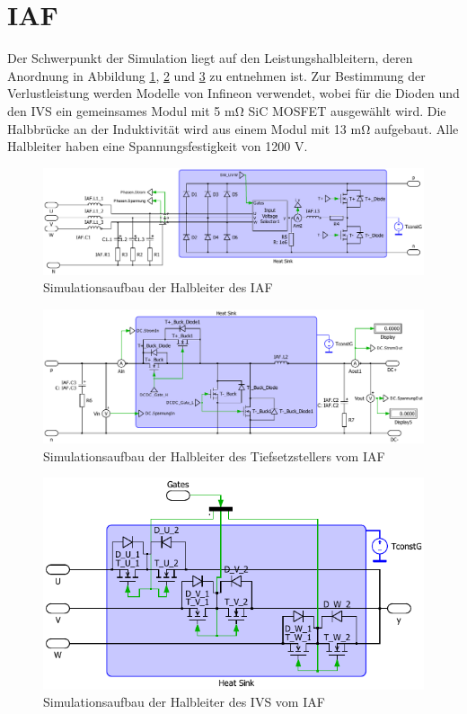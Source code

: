 \section{IAF}
	Der Schwerpunkt der Simulation liegt auf den Leistungshalbleitern, deren Anordnung in Abbildung \ref{fig:iafplecsmain}, \ref{fig:iafplecsbuck} und \ref{fig:iafplecsivs} zu entnehmen ist. Zur Bestimmung der Verlustleistung werden Modelle von Infineon verwendet, wobei für die Dioden und den \gls{IVS} ein gemeinsames Modul mit 5 \si{\milli \ohm} \gls{SiC} \gls{MOSFET} ausgewählt wird. Die Halbbrücke an der Induktivität wird aus einem Modul mit 13 \si{\milli \ohm} aufgebaut. Alle Halbleiter haben eine Spannungsfestigkeit von 1200 V.
	\begin{figure}
		\centering
		\includegraphics[width=1\linewidth]{content/Grafiken/IAF_Plecs_main}
		\caption{Simulationsaufbau der Halbleiter des IAF}
		\label{fig:iafplecsmain}
	\end{figure}
	\begin{figure}
		\centering
		\includegraphics[width=1\linewidth]{content/Grafiken/IAF_Plecs_Buck}
		\caption{Simulationsaufbau der Halbleiter des Tiefsetzstellers vom IAF}
		\label{fig:iafplecsbuck}
	\end{figure}
	
	\begin{figure}
		\centering
		\includegraphics[width=0.7\linewidth]{content/Grafiken/IAF_Plecs_IVS}
		\caption{Simulationsaufbau der Halbleiter des IVS vom IAF}
		\label{fig:iafplecsivs}
	\end{figure}
	

